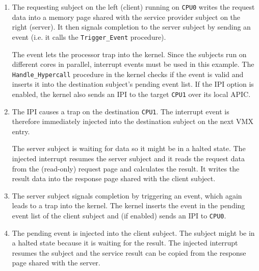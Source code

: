 \begin{enumerate}
	\item The requesting subject on the left (client) running on \texttt{CPU0}
		writes the request data into a memory page shared with the service
		provider subject on the right (server). It then signals completion to
		the server subject by sending an event (i.e.  it calls the
		\texttt{Trigger\_Event} procedure).

		The event lets the processor trap into the kernel. Since the subjects
		run on different cores in parallel, interrupt events must be used in
		this example. The \texttt{Handle\_Hypercall} procedure in the kernel
		checks if the event is valid and inserts it into the destination
		subject's pending event list. If the IPI option is enabled, the kernel
		also sends an IPI to the target \texttt{CPU1} over its local APIC.
	\item The IPI causes a trap on the destination \texttt{CPU1}. The interrupt
		event is therefore immediately injected into the destination subject on
		the next VMX entry.

		The server subject is waiting for data so it might be in a halted
		state.  The injected interrupt resumes the server subject and it reads
		the request data from the (read-only) request page and calculates the
		result. It writes the result data into the response page shared with
		the client subject.
	\item The server subject signals completion by triggering an event, which
		again leads to a trap into the kernel. The kernel inserts the event in
		the pending event list of the client subject and (if enabled) sends an
		IPI to \texttt{CPU0}.
	\item The pending event is injected into the client subject. The subject
		might be in a halted state because it is waiting for the result. The
		injected interrupt resumes the subject and the service result can be
		copied from the response page shared with the server.
\end{enumerate}
